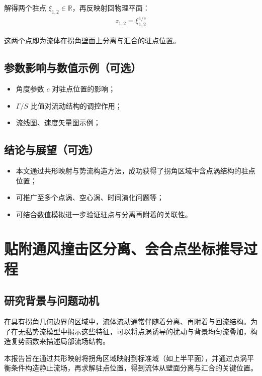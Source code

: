 解得两个驻点 $\xi_{1,2} \in \mathbb{R}$，再反映射回物理平面：
\begin{align}
    z_{1,2} = \xi_{1,2}^{1/c}
\end{align}

这两个点即为流体在拐角壁面上分离与汇合的驻点位置。


\subsection{参数影响与数值示例（可选）}


\begin{itemize}
    \item 角度参数 $c$ 对驻点位置的影响；
    \item $\Gamma/S$ 比值对流动结构的调控作用；
    \item 流线图、速度矢量图示例；
\end{itemize}


\subsection{结论与展望（可选）}


\begin{itemize}
    \item 本文通过共形映射与势流构造方法，成功获得了拐角区域中含点涡结构的驻点位置；
    \item 可推广至多个点涡、空心涡、时间演化问题等；
    \item 可结合数值模拟进一步验证驻点与分离再附着的关联性。
\end{itemize}

\section{贴附通风撞击区分离、会合点坐标推导过程}

\subsection{研究背景与问题动机}

在具有拐角几何边界的区域中，流体流动通常伴随着分离、再附着与回流结构。为了在无黏势流模型中揭示这些特征，可以将点涡诱导的扰动与背景均匀流叠加，构造复势函数来描述局部流场结构。

本报告旨在通过共形映射将拐角区域映射到标准域（如上半平面），并通过点涡平衡条件构造静止流场，再求解驻点位置，得到流体从壁面分离与汇合的关键位置。

